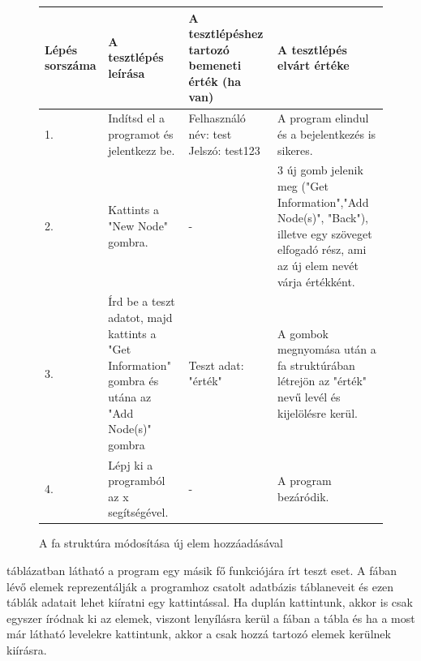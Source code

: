 \begin{figure} [h]
	\begin{center}
		\resizebox{\textwidth}{!} {
			\begin{tabular}{ |p{3cm}|p{5cm}|p{5cm}|p{5cm}| } 
				\hline
				Lépés sorszáma & A tesztlépés leírása & A tesztlépéshez tartozó bemeneti érték (ha van) & A tesztlépés elvárt értéke  \\ 
				\hline
				1. & Indítsd el a programot és jelentkezz be. & Felhasználó név: test \newline Jelszó: test123 & A program elindul és a bejelentkezés is sikeres.  \\ 
				\hline
				2. & Kattints a "New Node" gombra. & - & 3 új gomb jelenik meg ("Get Information","Add Node(s)", "Back"), illetve egy szöveget elfogadó rész, ami az új elem nevét várja értékként.\\ 
				\hline
				3. & Írd be a teszt adatot, majd kattints a "Get Information" gombra és utána az "Add Node(s)" gombra & Teszt adat: "érték" & A gombok megnyomása után a fa struktúrában létrejön az "érték" nevű levél és kijelölésre kerül. \\
				\hline
				4. & Lépj ki a programból az x segítségével. & - & A program bezáródik. \\
				\hline
			\end{tabular}
		}
	\end{center}
	\caption{A fa struktúra módosítása új elem hozzáadásával}
	\label{fig:addnode}
\end{figure}

\newpage

 táblázatban látható a program egy másik fő funkciójára írt teszt eset. A fában lévő elemek reprezentálják a programhoz csatolt adatbázis táblaneveit és ezen táblák adatait lehet kiíratni egy kattintással. Ha duplán kattintunk, akkor is csak egyszer íródnak ki az elemek, viszont lenyílásra kerül a fában a tábla és ha a most már látható levelekre kattintunk, akkor a csak hozzá tartozó elemek kerülnek kiírásra.

